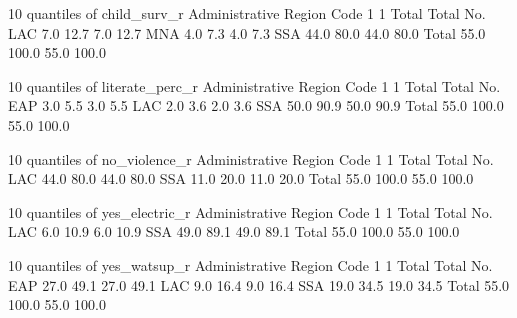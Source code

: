 	10 quantiles of child_surv_r			
Administrative Region Code	1	1	Total	Total
	No.	%
LAC	7.0	12.7	7.0	12.7
MNA	4.0	7.3	4.0	7.3
SSA	44.0	80.0	44.0	80.0
Total	55.0	100.0	55.0	100.0

	10 quantiles of literate_perc_r			
Administrative Region Code	1	1	Total	Total
	No.	%
EAP	3.0	5.5	3.0	5.5
LAC	2.0	3.6	2.0	3.6
SSA	50.0	90.9	50.0	90.9
Total	55.0	100.0	55.0	100.0

	10 quantiles of no_violence_r			
Administrative Region Code	1	1	Total	Total
	No.	%
LAC	44.0	80.0	44.0	80.0
SSA	11.0	20.0	11.0	20.0
Total	55.0	100.0	55.0	100.0

	10 quantiles of yes_electric_r			
Administrative Region Code	1	1	Total	Total
	No.	%
LAC	6.0	10.9	6.0	10.9
SSA	49.0	89.1	49.0	89.1
Total	55.0	100.0	55.0	100.0

	10 quantiles of yes_watsup_r			
Administrative Region Code	1	1	Total	Total
	No.	%
EAP	27.0	49.1	27.0	49.1
LAC	9.0	16.4	9.0	16.4
SSA	19.0	34.5	19.0	34.5
Total	55.0	100.0	55.0	100.0

